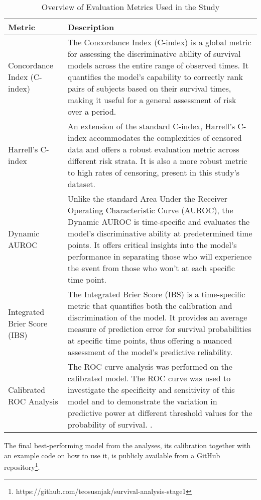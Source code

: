 \documentclass{article}
\begin{document}
\begin{table}[h!]
    \centering
    \caption{Overview of Evaluation Metrics Used in the Study}
    \begin{tabularx}{\textwidth}{lX}
    \toprule
    Metric & Description \\
    \midrule
    Concordance Index (C-index) \cite{harrell1982} & The Concordance Index (C-index) is a global metric for assessing the discriminative ability of survival models across the entire range of observed times. It quantifies the model's capability to correctly rank pairs of subjects based on their survival times, making it useful for a general assessment of risk over a period. \\
    \addlinespace
    Harrell's C-index \cite{harrell2015} & An extension of the standard C-index, Harrell's C-index accommodates the complexities of censored data and offers a robust evaluation metric across different risk strata. It is also a more robust metric to high rates of censoring, present in this study's dataset. \\
    \addlinespace
    Dynamic AUROC \cite{hanley1982} & Unlike the standard Area Under the Receiver Operating Characteristic Curve (AUROC), the Dynamic AUROC is time-specific and evaluates the model's discriminative ability at predetermined time points. It offers critical insights into the model's performance in separating those who will experience the event from those who won't at each specific time point. \\
    \addlinespace
    Integrated Brier Score (IBS) \cite{graf1999} & The Integrated Brier Score (IBS) is a time-specific metric that quantifies both the calibration and discrimination of the model. It provides an average measure of prediction error for survival probabilities at specific time points, thus offering a nuanced assessment of the model's predictive reliability. \\
    \addlinespace
    Calibrated ROC Analysis & The ROC curve analysis was performed on the calibrated model. The ROC curve was used to investigate the specificity and sensitivity of this model and to demonstrate the variation in predictive power at different threshold values for the probability of survival.   \cite{manz2020ml}. \\
    \bottomrule
    \end{tabularx}
    \label{tab:eval}
\end{table}

The final best-performing model from the analyses, its calibration together with an example code on how to use it, is publicly available from a GitHub repository\footnote{https://github.com/teosusnjak/survival-analysis-stage1}.
\end{document}
